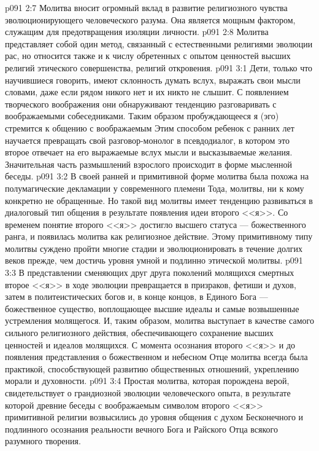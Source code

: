 \vs p091 2:7 Молитва вносит огромный вклад в развитие религиозного чувства эволюционирующего человеческого разума. Она является мощным фактором, служащим для предотвращения изоляции личности.
\vs p091 2:8 Молитва представляет собой один метод, связанный с естественными религиями эволюции рас, но относится также и к числу обретенных с опытом ценностей высших религий этического совершенства, религий откровения.
\vs p091 3:1 Дети, только что научившиеся говорить, имеют склонность думать вслух, выражать свои мысли словами, даже если рядом никого нет и их никто не слышит. С появлением творческого воображения они обнаруживают тенденцию разговаривать с воображаемыми собеседниками. Таким образом пробуждающееся я (эго) стремится к общению с воображаемым  Этим способом ребенок с ранних лет научается превращать свой разговор\hyp{}монолог в псевдодиалог, в котором это второе  отвечает на его выражаемые вслух мысли и высказываемые желания. Значительная часть размышлений взрослого происходит в форме мысленной беседы.
\vs p091 3:2 В своей ранней и примитивной форме молитва была похожа на полумагические декламации у современного племени Тода, молитвы, ни к кому конкретно не обращенные. Но такой вид молитвы имеет тенденцию развиваться в диалоговый тип общения в результате появления идеи второго <<я>>. Со временем понятие второго <<я>> достигло высшего статуса --- божественного ранга, и появилась молитва как религиозное действие. Этому примитивному типу молитвы суждено пройти многие стадии и эволюционировать в течение долгих веков прежде, чем достичь уровня умной и подлинно этической молитвы.
\vs p091 3:3 В представлении сменяющих друг друга поколений молящихся смертных второе <<я>> в ходе эволюции превращается в призраков, фетиши и духов, затем в политеистических богов и, в конце концов, в Единого Бога --- божественное существо, воплощающее высшие идеалы и самые возвышенные устремления молящегося. И, таким образом, молитва выступает в качестве самого сильного религиозного действия, обеспечивающего сохранение высших ценностей и идеалов молящихся. С момента осознания второго <<я>> и до появления представления о божественном и небесном Отце молитва всегда была практикой, способствующей развитию общественных отношений, укреплению морали и духовности.
\vs p091 3:4 Простая молитва, которая порождена верой, свидетельствует о грандиозной эволюции человеческого опыта, в результате которой древние беседы с воображаемым символом второго <<я>> примитивной религии возвысились до уровня общения с духом Бесконечного и подлинного осознания реальности вечного Бога и Райского Отца всякого разумного творения.
